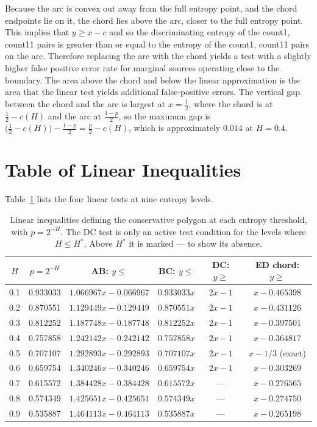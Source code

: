 \documentclass[11pt]{article}
\begin{document}
Because the arc is convex out away from the full entropy point, and the
chord endpoints lie on it, the chord lies
above the arc, closer to the full entropy point. This implies that $y\ge x-c$
and so the discriminating entropy of the count1, count11 pairs is greater than
or equal to the entropy of the count1, count11 pairs on the arc.
Therefore replacing the arc with the chord yields a test with a slightly higher
false positive error rate for marginal sources operating close to the boundary. The
area above the chord and below the linear approximation is the area that the
linear test yields additional false-positive errors. The vertical gap
between the chord and the arc is largest at $x=\tfrac12$, where the chord is
at $\tfrac12-c(H)$ and the arc at $\tfrac{1-p}{2}$, so the maximum gap is
$\bigl(\tfrac12-c(H)\bigr)-\tfrac{1-p}{2}=\tfrac{p}{2}-c(H)$,
which is approximately $0.014$ at $H=0.4$.

\section{Table of Linear Inequalities}
\label{sec:table}

Table~\ref{tab:ineq} lists the four linear tests at nine entropy levels.

\begin{table}[htbp]
\centering
\caption{Linear inequalities defining the conservative polygon at each
entropy threshold, with $p=2^{-H}$. The DC test is only an active test condition
 for the levels where $H \le H^\ast$. Above $H^\ast$ it is marked --- to show
 its absence.}
\label{tab:ineq}
\begin{tabular}{cccccc}
\toprule
$H$ & $p=2^{-H}$ & AB: $y\le$ & BC: $y\le$ & DC: $y\ge$ & ED chord: $y\ge$\\
\midrule
0.1 & 0.933033 & $1.066967x - 0.066967$ & $0.933033x$ & $2x-1$ & $x - 0.465398$\\
0.2 & 0.870551 & $1.129449x - 0.129449$ & $0.870551x$ & $2x-1$ & $x - 0.431126$\\
0.3 & 0.812252 & $1.187748x - 0.187748$ & $0.812252x$ & $2x-1$ & $x - 0.397501$\\
0.4 & 0.757858 & $1.242142x - 0.242142$ & $0.757858x$ & $2x-1$ & $x - 0.364817$\\
0.5 & 0.707107 & $1.292893x - 0.292893$ & $0.707107x$ & $2x-1$ & $x - 1/3$ (exact)\\
0.6 & 0.659754 & $1.340246x - 0.340246$ & $0.659754x$ & $2x-1$ & $x - 0.303269$\\
0.7 & 0.615572 & $1.384428x - 0.384428$ & $0.615572x$ & --- & $x - 0.276565$\\
0.8 & 0.574349 & $1.425651x - 0.425651$ & $0.574349x$ & --- & $x - 0.274750$\\
0.9 & 0.535887 & $1.464113x - 0.464113$ & $0.535887x$ & --- & $x - 0.265198$\\
\bottomrule
\end{tabular}
\end{table}
\end{document}

